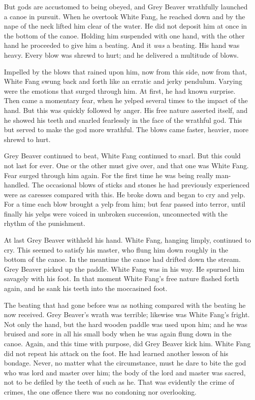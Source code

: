\documentclass[10pt]{book}
\begin{document}
But gods are accustomed to being obeyed, and Grey Beaver wrathfully
launched a canoe in pursuit. When he overtook White Fang, he reached
down and by the nape of the neck lifted him clear of the water. He did
not deposit him at once in the bottom of the canoe. Holding him
suspended with one hand, with the other hand he proceeded to give him a
beating. And it \emph{was} a beating. His hand was heavy. Every blow was
shrewd to hurt; and he delivered a multitude of blows.

Impelled by the blows that rained upon him, now from this side, now
from that, White Fang swung back and forth like an erratic and jerky
pendulum. Varying were the emotions that surged through him. At first,
he had known surprise. Then came a momentary fear, when he yelped
several times to the impact of the hand. But this was quickly followed
by anger. His free nature asserted itself, and he showed his teeth and
snarled fearlessly in the face of the wrathful god. This but served to
make the god more wrathful. The blows came faster, heavier, more shrewd
to hurt.

Grey Beaver continued to beat, White Fang continued to snarl. But this
could not last for ever. One or the other must give over, and that one
was White Fang. Fear surged through him again. For the first time he
was being really man-handled. The occasional blows of sticks and stones
he had previously experienced were as caresses compared with this. He
broke down and began to cry and yelp. For a time each blow brought a
yelp from him; but fear passed into terror, until finally his yelps
were voiced in unbroken succession, unconnected with the rhythm of the
punishment.

At last Grey Beaver withheld his hand. White Fang, hanging limply,
continued to cry. This seemed to satisfy his master, who flung him down
roughly in the bottom of the canoe. In the meantime the canoe had
drifted down the stream. Grey Beaver picked up the paddle. White Fang
was in his way. He spurned him savagely with his foot. In that moment
White Fang’s free nature flashed forth again, and he sank his teeth
into the moccasined foot.

The beating that had gone before was as nothing compared with the
beating he now received. Grey Beaver’s wrath was terrible; likewise was
White Fang’s fright. Not only the hand, but the hard wooden paddle was
used upon him; and he was bruised and sore in all his small body when
he was again flung down in the canoe. Again, and this time with
purpose, did Grey Beaver kick him. White Fang did not repeat his attack
on the foot. He had learned another lesson of his bondage. Never, no
matter what the circumstance, must he dare to bite the god who was lord
and master over him; the body of the lord and master was sacred, not to
be defiled by the teeth of such as he. That was evidently the crime of
crimes, the one offence there was no condoning nor overlooking.
\end{document}
